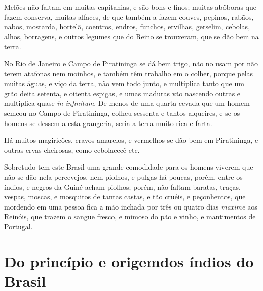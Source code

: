 Melões não faltam em muitas capitanias, e são bons e
finos; muitas abóboras que fazem conserva, muitas alfaces, de que
também a fazem couves, pepinos, rabãos, nabos, mostarda, hortelã,
coentros, endros, funchos, ervilhas, gerselim, cebolas, alhos,
borragens, e outros legumes que do Reino se trouxeram, que se dão bem
na terra.

 No Rio de Janeiro e Campo de Piratininga se dá bem
trigo, não no usam por não terem atafonas nem moinhos, e também têm
trabalho em o colher, porque pelas muitas águas, e viço da terra, não
vem todo junto, e multiplica tanto que um grão deita setenta, e oitenta
espigas, e umas maduras vão nascendo outras e multiplica quase
\textit{in infinitum}. De menos de uma quarta cevada que um homem semeou no Campo
de Piratininga, colheu sessenta e tantos alqueires, e se os homens se
dessem a esta grangeria, seria a terra muito rica e farta.

 Há muitos magiricões, cravos amarelos, e
vermelhos se dão bem em Piratininga, e outras ervas cheirosas, como
cebolacecê etc.

 Sobretudo tem este Brasil uma grande comodidade para os homens viverem
que não se dão nela percevejos, nem piolhos, e pulgas há poucas, porém,
entre os índios, e negros da Guiné acham piolhos; porém, não faltam
baratas, traças, vespas, moscas, e mosquitos de tantas castas, e tão
cruéis, e peçonhentos, que mordendo em uma pessoa fica a mão inchada
por três ou quatro dias \textit{maxime} aos Reinóis, que trazem o sangue fresco,
e mimoso do pão e vinho, e mantimentos de Portugal.

\chapter[Do princípio e origem dos índios do Brasil e de seus costumes, 
adoração e cerimônias \medskip]{Do princípio e origem\break dos índios do Brasil}

